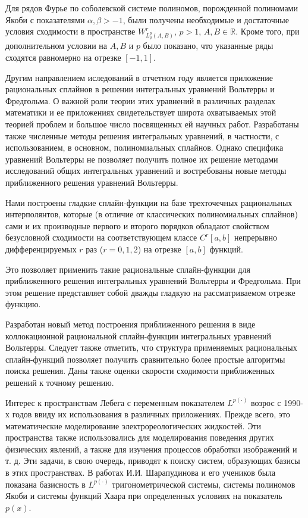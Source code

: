 Для рядов Фурье по соболевской системе полиномов, порожденной полиномами Якоби с показателями $\alpha, \beta  > -1$, были получены необходимые и достаточные условия сходимости в пространстве $W^r_{L^p_\rho(A,B)}$, $p > 1$, $A, B \in \mathbb{R}$. Кроме того, при дополнительном условии на $A, B$ и $p$ было показано, что  указанные ряды сходятся равномерно на отрезке $[-1,1]$.


Другим направлением иследований в отчетном году является приложение рациональных сплайнов в решении интегральных уравнений Вольтерры и Фредгольма. О важной роли теории этих уравнений в различных разделах математики и ее приложениях свидетельствует широта охватываемых этой теорией проблем и большое число посвященных ей научных работ. Разработаны также численные методы решения интегральных уравнений, в частности, с использованием, в основном, полиномиальных сплайнов. Однако специфика уравнений Вольтерры не позволяет получить полное их решение методами исследований общих интегральных уравнений и востребованы новые методы приближенного решения уравнений Вольтерры.

Нами построены гладкие сплайн-функции на базе трехточечных рациональных
интерполянтов, которые (в отличие от классических полиномиальных сплайнов)
сами и их производные первого и второго
порядков обладают свойством безусловной сходимости
на соответствующем классе $C^r[a,b]$ непрерывно дифференцируемых $r$ раз
($r=0,1,2$) на отрезке $[a,b]$ функций.

Это позволяет применить такие рациональные сплайн-функции для приближенного
решения интегральных уравнений Вольтерры и Фредгольма.
При этом решение представляет собой дважды гладкую на рассматриваемом отрезке
функцию.

Разработан новый метод построения
приближенного решения в виде коллокационной рациональной сплайн-функции
интегральных уравнений Вольтерры.
Следует также отметить, что структура применяемых рациональных сплайн-функций
позволяет получить сравнительно более простые алгоритмы поиска решения.
Даны также оценки скорости сходимости приближенных решений к точному решению.


Интерес к пространствам Лебега с переменным показателем $L^{p(\cdot)}$ возрос с 1990-х годов ввиду
их использования в различных приложениях. Прежде всего, это математические
моделирование электрореологических жидкостей. Эти пространства также использовались для моделирования поведения других физических явлений, а также для изучения процессов обработки изображений и т. д. Эти задачи, в свою очередь, приводят к поиску систем, образующих базисы в этих пространствах. В работах И.И. Шарапудинова и его учеников \cite{tad-SHII-Haar,tad-SHII-AnalisysMath,tad-SHII-Leg,tad-MMG-Haar,tad-SHII-Jacob,tad-SHII-Ult,tad-RAM-Jacob} была показана базисность в $L^{p(\cdot)}$  тригонометрической системы, системы полиномов Якоби и системы функций Хаара при определенных условиях на показатель $p(x)$.

